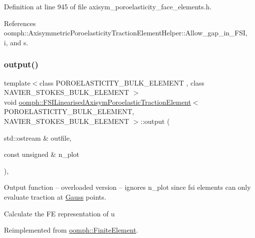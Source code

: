 Definition at line 945 of file axisym\+\_\+poroelasticity\+\_\+face\+\_\+elements.\+h.



References oomph\+::\+Axisymmetric\+Poroelasticity\+Traction\+Element\+Helper\+::\+Allow\+\_\+gap\+\_\+in\+\_\+\+F\+SI, i, and s.

\mbox{\label{classoomph_1_1FSILinearisedAxisymPoroelasticTractionElement_af571d66ac4dcf3cb0219426dea20131c}} 
\subsubsection{\texorpdfstring{output()}{output()}}
{\footnotesize\ttfamily template$<$class P\+O\+R\+O\+E\+L\+A\+S\+T\+I\+C\+I\+T\+Y\+\_\+\+B\+U\+L\+K\+\_\+\+E\+L\+E\+M\+E\+NT , class N\+A\+V\+I\+E\+R\+\_\+\+S\+T\+O\+K\+E\+S\+\_\+\+B\+U\+L\+K\+\_\+\+E\+L\+E\+M\+E\+NT $>$ \\
void \hyperlink{classoomph_1_1FSILinearisedAxisymPoroelasticTractionElement}{oomph\+::\+F\+S\+I\+Linearised\+Axisym\+Poroelastic\+Traction\+Element}$<$ P\+O\+R\+O\+E\+L\+A\+S\+T\+I\+C\+I\+T\+Y\+\_\+\+B\+U\+L\+K\+\_\+\+E\+L\+E\+M\+E\+NT, N\+A\+V\+I\+E\+R\+\_\+\+S\+T\+O\+K\+E\+S\+\_\+\+B\+U\+L\+K\+\_\+\+E\+L\+E\+M\+E\+NT $>$\+::output (\begin{DoxyParamCaption}\item[{std\+::ostream \&}]{outfile,  }\item[{const unsigned \&}]{n\+\_\+plot }\end{DoxyParamCaption})\hspace{0.3cm}{\ttfamily [inline]}, {\ttfamily [virtual]}}



Output function -- overloaded version -- ignores n\+\_\+plot since fsi elements can only evaluate traction at \hyperlink{classoomph_1_1Gauss}{Gauss} points. 

Calculate the FE representation of u 

Reimplemented from \hyperlink{classoomph_1_1FiniteElement_afa9d9b2670f999b43e6679c9dd28c457}{oomph\+::\+Finite\+Element}.



